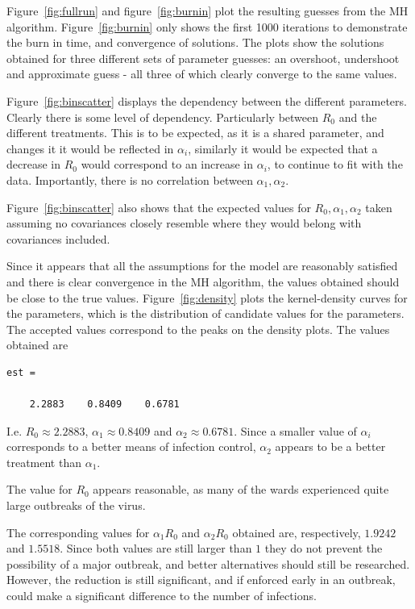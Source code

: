 \documentclass{X:/Documents/Coding/Latex/myassignment}
\begin{document}
Figure~\ref{fig:fullrun} and figure~\ref{fig:burnin} plot the resulting guesses from the MH algorithm. Figure~\ref{fig:burnin} only shows the first 1000 iterations to demonstrate the burn in time, and convergence of solutions. The plots show the solutions obtained for three different sets of parameter guesses: an overshoot, undershoot and approximate guess - all three of which clearly converge to the same values.


Figure~\ref{fig:binscatter} displays the dependency between the different parameters. Clearly there is some level of dependency. Particularly between $R_0$ and the different treatments. This is to be expected, as it is a shared parameter, and changes it it would be reflected in $\alpha_i$, similarly it would be expected that a decrease in $R_0$ would correspond to an increase in $\alpha_i$, to continue to fit with the data. Importantly, there is no correlation between $\alpha_1, \alpha_2$.

Figure~\ref{fig:binscatter} also shows that the expected values for $R_0,\alpha_1,\alpha_2$ taken assuming no covariances closely resemble where they would belong with covariances included.

Since it appears that all the assumptions for the model are reasonably satisfied and there is clear convergence in the MH algorithm, the values obtained should be close to the true values. 
Figure~\ref{fig:density} plots the kernel-density curves for the parameters, which is the distribution of candidate values for the parameters. The accepted values correspond to the peaks on the density plots. The values obtained are
\begin{verbatim}
est =

    2.2883    0.8409    0.6781
\end{verbatim} 
I.e. $R_0 \approx 2.2883$, $\alpha_1 \approx 0.8409$ and $\alpha_2 \approx 0.6781$. Since a smaller value of $\alpha_i$ corresponds to a better means of infection control, $\alpha_2$ appears to be a better treatment than $\alpha_1$. 

The value for $R_0$ appears reasonable, as many of the wards experienced quite large outbreaks of the virus.

The corresponding values for $\alpha_1 R_0$ and $\alpha_2 R_0$ obtained are, respectively, $1.9242$ and $1.5518$. Since both values are still larger than $1$ they do not prevent the possibility of a major outbreak, and better alternatives should still be researched. However, the reduction is still significant, and if enforced early in an outbreak, could make a significant difference to the number of infections.
\end{document}
